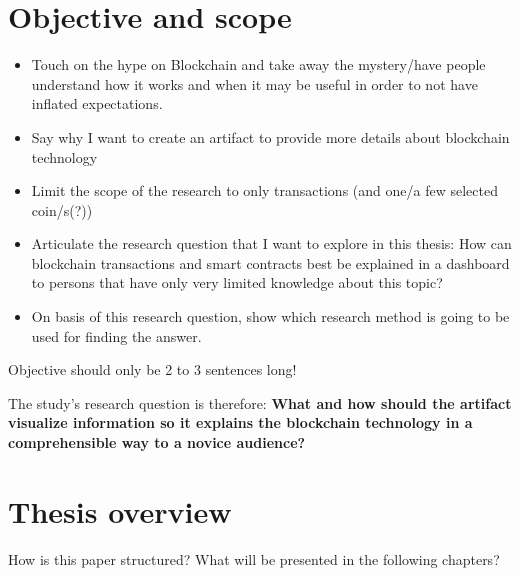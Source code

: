 \section{Objective and scope} \label{sec:Objective}
\begin{itemize}
    \item Touch on the hype on Blockchain and take away the mystery/have people understand how it works and when it may be useful in order to not have inflated expectations.
    \item Say why I want to create an artifact to provide more details about blockchain technology
    \item Limit the scope of the research to only transactions (and one/a few selected coin/s(?))
    \item Articulate the research question that I want to explore in this thesis: How can blockchain transactions and smart contracts best be explained in a dashboard to persons that have only very limited knowledge about this topic?
    \item On basis of this research question, show which research method is going to be used for finding the answer.

\end{itemize}


    Objective should only be 2 to 3 sentences long!
    
    The study's research question is therefore: \textbf{What and how should the artifact visualize information so it explains the blockchain technology in a comprehensible way to a novice audience?}
    
\section{Thesis overview} \label{sec:ThesisOverview}
How is this paper structured? What will be presented in the following chapters?


